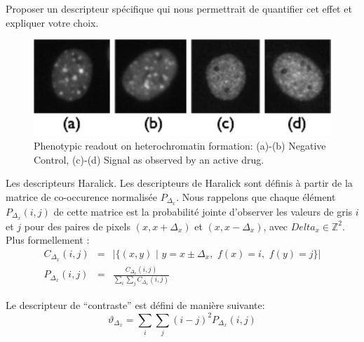 \documentclass[11pt,addpoints]{exam}
\begin{document}
\begin{questions}
Proposer un descripteur spécifique qui nous permettrait de quantifier
cet effet et expliquer votre choix. 

\begin{figure}[!ht]
\centering
\includegraphics[scale=0.8]{TSA_phenotype.pdf}
\caption{Phenotypic readout on heterochromatin formation: (a)-(b)
  Negative Control, (c)-(d) Signal as observed 
  by an active drug.}
\label{fig:tsa}
\end{figure}

\question[4] Les descripteurs Haralick.
Les descripteurs de Haralick sont définis à partir de la matrice de
co-occurence normalisée $P_{\Delta_x}$. Nous rappelons que chaque élément
$P_{\Delta_x}(i,j)$ de cette matrice est la probabilité jointe
d'observer les valeurs de gris $i$ et $j$ pour des paires de pixels
$(x,x+\Delta_x)$ et $(x,x-\Delta_x)$, avec $Delta_x \in
\mathbb{Z}^2$. Plus formellement :  
\begin{eqnarray*}
C_{\Delta_x}(i,j) &=& |\{(x,y) \,\,| \,\, y=x \pm \Delta_x, \,\, f(x)=i,
\,\, f(y)=j \}| \\
P_{\Delta_x}(i,j) &=& \frac{C_{\Delta_x}(i,j)}{\sum_i\sum_j C_{\Delta_x}(i,j)}
\end{eqnarray*} 


Le descripteur de ``contraste'' est défini de manière suivante: 
\begin{equation}\label{equ:haralick_contrast}
\vartheta_{\Delta_x} = \sum_i\sum_j(i-j)^2P_{\Delta_x}(i,j)
\end{equation}

\end{questions}
\end{document}
